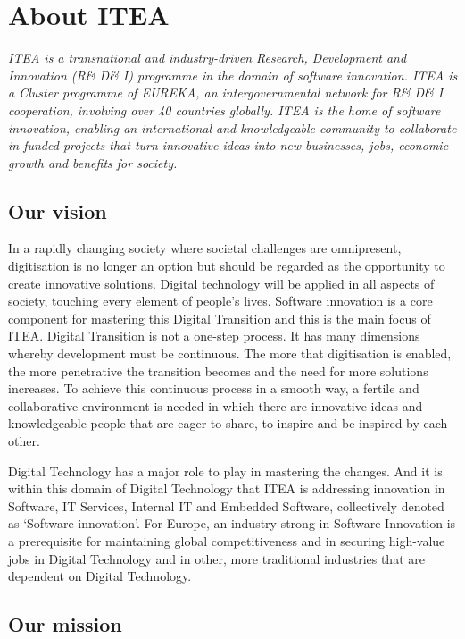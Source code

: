 \chapter{About ITEA}

\emph{ITEA is a transnational and industry-driven Research, Development and Innovation (R\& D\& I) programme in the domain of software innovation. ITEA is a Cluster programme of EUREKA, an intergovernmental network for R\& D\& I cooperation, involving over 40 countries globally. ITEA is the home of software innovation, enabling an international and knowledgeable community to collaborate in funded projects that turn innovative ideas into new businesses, jobs, economic growth and benefits for society.}

\section{Our vision}

In a rapidly changing society where societal challenges are omnipresent, digitisation is no longer an option but should be regarded as the opportunity to create innovative solutions. Digital technology will be applied in all aspects of society, touching every element of people’s lives. Software innovation is a core component for mastering this Digital Transition and this is the main focus of ITEA. Digital Transition is not a one-step process. It has many dimensions whereby development must be continuous. The more that digitisation is enabled, the more penetrative the transition becomes and the need for more solutions increases. To achieve this continuous process in a smooth way, a fertile and collaborative environment is needed in which there are innovative ideas and knowledgeable people that are eager to share, to inspire and be inspired by each other.

Digital Technology has a major role to play in mastering the changes. And it is within this domain of Digital Technology that ITEA is addressing innovation in Software, IT Services, Internal IT and Embedded Software, collectively denoted as ‘Software innovation’. For Europe, an industry strong in Software Innovation is a prerequisite for maintaining global competitiveness and in securing high-value jobs in Digital Technology and in other, more traditional industries that are dependent on Digital Technology.

\section{Our mission}

